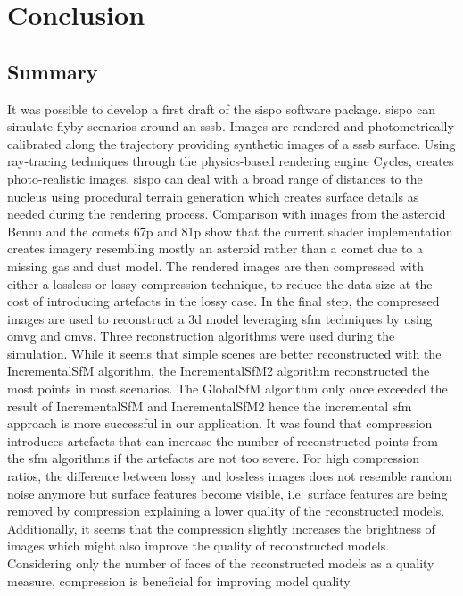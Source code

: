 \section{Conclusion} \label{sec:conclusion}
\subsection{Summary}
It was possible to develop a first draft of the \gls{sispo} software package. \Gls{sispo} can simulate flyby scenarios around an \gls{sssb}. Images are rendered and photometrically calibrated along the trajectory providing synthetic images of a \gls{sssb} surface. Using ray-tracing techniques through the physics-based rendering engine Cycles, creates photo-realistic images. \Gls{sispo} can deal with a broad range of distances to the nucleus using procedural terrain generation which creates surface details as needed during the rendering process. Comparison with images from the asteroid Bennu and the comets \gls{67p} and \gls{81p} show that the current shader implementation creates imagery resembling mostly an asteroid rather than a comet due to a missing gas and dust model. The rendered images are then compressed with either a lossless or lossy compression technique, to reduce the data size at the cost of introducing artefacts in the lossy case. In the final step, the compressed images are used to reconstruct a \gls{3d} model leveraging \gls{sfm} techniques by using \gls{omvg} and \gls{omvs}. Three reconstruction algorithms were used during the simulation. While it seems that simple scenes are better reconstructed with the IncrementalSfM algorithm, the IncrementalSfM2 algorithm reconstructed the most points in most scenarios. The GlobalSfM algorithm only once exceeded the result of IncrementalSfM and IncrementalSfM2 hence the incremental \gls{sfm} approach is more successful in our application. It was found that compression introduces artefacts that can increase the number of reconstructed points from the \gls{sfm} algorithms if the artefacts are not too severe. For high compression ratios, the difference between lossy and lossless images does not resemble random noise anymore but surface features become visible, i.e. surface features are being removed by compression explaining a lower quality of the reconstructed models. Additionally, it seems that the compression slightly increases the brightness of images which might also improve the quality of reconstructed models. Considering only the number of faces of the reconstructed models as a quality measure, compression is beneficial for improving model quality.
